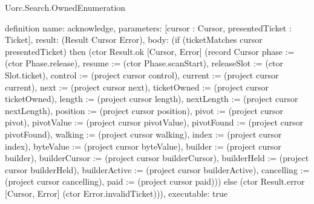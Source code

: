 \begin{lexlean}{Uorc.Search.OwnedEnumeration}
\begin{semanticmodule}
definition{
  name: acknowledge,
  parameters: [cursor : Cursor, presentedTicket : Ticket],
  result: (Result Cursor Error),
  body: (if (ticketMatches cursor presentedTicket) then (ctor Result.ok [Cursor, Error] (record Cursor {phase := (ctor Phase.release), resume := (ctor Phase.scanStart), releaseSlot := (ctor Slot.ticket), control := (project cursor control), current := (project cursor current), next := (project cursor next), ticketOwned := (project cursor ticketOwned), length := (project cursor length), nextLength := (project cursor nextLength), position := (project cursor position), pivot := (project cursor pivot), pivotValue := (project cursor pivotValue), pivotFound := (project cursor pivotFound), walking := (project cursor walking), index := (project cursor index), byteValue := (project cursor byteValue), builder := (project cursor builder), builderCursor := (project cursor builderCursor), builderHeld := (project cursor builderHeld), builderActive := (project cursor builderActive), cancelling := (project cursor cancelling), paid := (project cursor paid)})) else (ctor Result.error [Cursor, Error] (ctor Error.invalidTicket))),
  executable: true
}


\end{semanticmodule}
\end{lexlean}
